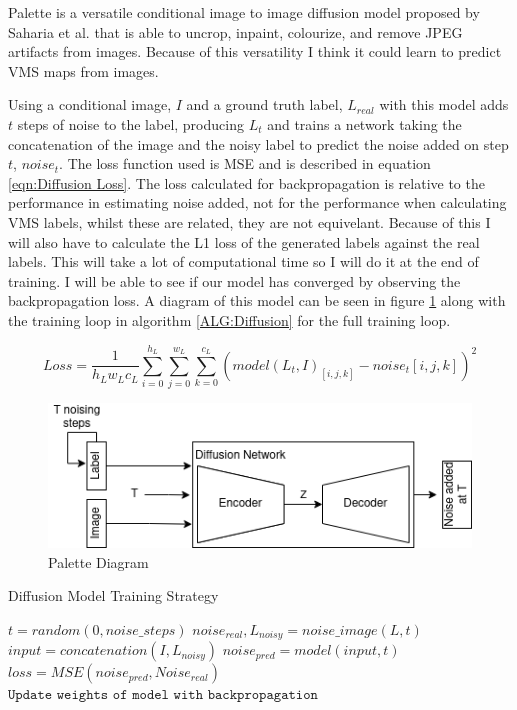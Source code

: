 \documentclass{UoYCSproject}
\begin{document}
Palette is a versatile conditional image to image diffusion model proposed by Saharia et al. \cite{saharia2022palette} that is able to uncrop, inpaint, colourize, and remove JPEG artifacts from images. Because of this versatility I think it could learn to predict VMS maps from images. 

Using a conditional image, $I$ and a ground truth label, $L_{real}$ with this model adds $t$ steps of noise to the label, producing $L_{t}$ and trains a network taking the concatenation of the image and the noisy label to predict the noise added on step $t$, $noise_t$. The loss function used is MSE and is described in equation \ref{eqn:Diffusion Loss}. The loss calculated for backpropagation is relative to the performance in estimating noise added, not for the performance when calculating VMS labels, whilst these are related, they are not equivelant. Because of this I will also have to calculate the L1 loss of the generated labels against the real labels. This will take a lot of computational time so I will do it at the end of training. I will be able to see if our model has converged by observing the backpropagation loss. A diagram of this model can be seen in figure \ref{fig:DiffusionDiagram} along with the training loop in algorithm \ref{ALG:Diffusion} for the full training loop.

\begin{equation}
    \label{eqn:Diffusion Loss}
    Loss = \frac{1}{h_Lw_Lc_L} \sum_{i=0}^{h_L} \sum_{j=0}^{w_L} \sum_{k=0}^{c_L} (model(L_{t}, I)_{[i,j,k]} - noise_t[i,j,k] )^2
\end{equation}

\begin{figure}[h]
    \centering
    \includegraphics[width=\linewidth]{Diffusion Model}
    \caption{Palette Diagram}
    \label{fig:DiffusionDiagram}
\end{figure}

\begin{algorithm}
\caption{Diffusion Model Training Strategy}\label{ALG:Diffusion}
\begin{algorithmic}[1]
\State
\State $t = random(0, noise\_steps)$
\State $noise_{real}, L_{noisy} = noise\_image(L, t)$ 
\State
\State $input = concatenation(I, L_{noisy})$
\State $noise_{pred} = model(input, t)$
\State $loss = MSE( noise_{pred}, Noise_{real} )$
\State $\texttt{Update weights of model with backpropagation}$
\EndFor
\EndFor
\end{algorithmic}
\end{algorithm}
\end{document}
